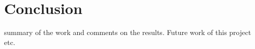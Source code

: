 \section{Conclusion}
summary of the work and comments on the results. Future work of this project etc.